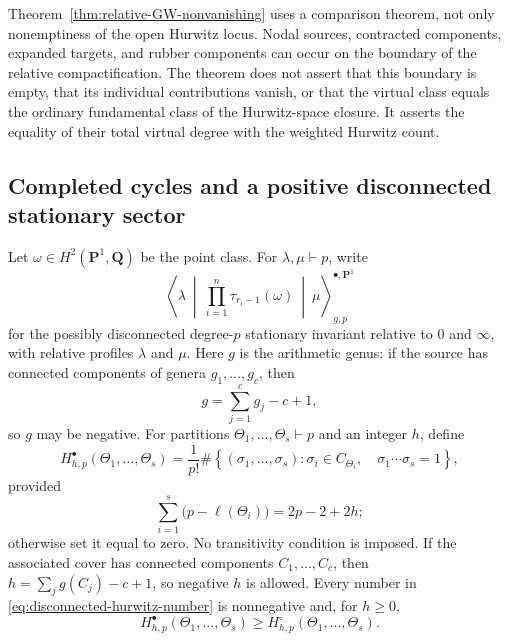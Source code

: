 \documentclass[10pt,a4paper]{amsart}
\numberwithin{equation}{section}
\begin{document}
Theorem~\ref{thm:relative-GW-nonvanishing} uses a comparison theorem, not
only nonemptiness of the open Hurwitz locus.  Nodal sources, contracted
components, expanded targets, and rubber components can occur on the
boundary of the relative compactification.  The theorem does not assert
that this boundary is empty, that its individual contributions vanish, or
that the virtual class equals the ordinary fundamental class of the
Hurwitz-space closure.  It asserts the equality of their total virtual
degree with the weighted Hurwitz count.

\subsection{Completed cycles and a positive disconnected stationary sector}

Let $\omega\in H^2(\mathbf P^1,\mathbf Q)$ be the point class.  For
$\lambda,\mu\vdash p$, write
\[
 \left\langle\lambda\ \middle|\
   \prod_{i=1}^n\tau_{r_i-1}(\omega)\
   \middle|\ \mu\right\rangle^{\bullet,\mathbf P^1}_{g,p}
\]
for the possibly disconnected degree-$p$ stationary invariant relative to
$0$ and $\infty$, with relative profiles $\lambda$ and $\mu$.  Here $g$ is
the arithmetic genus: if the source has connected components of genera
$g_1,\ldots,g_c$, then
\[
 g=\sum_{j=1}^c g_j-c+1,
\]
so $g$ may be negative.  For partitions
$\Theta_1,\ldots,\Theta_s\vdash p$ and an integer $h$, define
\begin{equation}\label{eq:disconnected-hurwitz-number}
 H^\bullet_{h,p}(\Theta_1,\ldots,\Theta_s)
 =\frac1{p!}\#\left\{(\sigma_1,\ldots,\sigma_s):
  \sigma_i\in C_{\Theta_i},\quad
  \sigma_1\cdots\sigma_s=1\right\},
\end{equation}
provided
\begin{equation}\label{eq:disconnected-hurwitz-RH}
 \sum_{i=1}^s\bigl(p-\ell(\Theta_i)\bigr)=2p-2+2h;
\end{equation}
otherwise set it equal to zero.  No transitivity condition is imposed.
If the associated cover has connected components $C_1,\ldots,C_c$, then
$h=\sum_jg(C_j)-c+1$, so negative $h$ is allowed.  Every number in
\eqref{eq:disconnected-hurwitz-number} is nonnegative and, for $h\geq0$,
\begin{equation}\label{eq:connected-contained-in-disconnected}
 H^\bullet_{h,p}(\Theta_1,\ldots,\Theta_s)
 \geq H^\circ_{h,p}(\Theta_1,\ldots,\Theta_s).
\end{equation}
\end{document}
